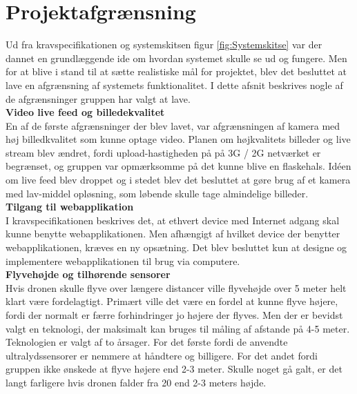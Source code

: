 \chapter{Projektafgrænsning}



Ud fra kravspecifikationen og systemskitsen figur \ref{fig:Systemskitse} var der dannet en grundlæggende ide om hvordan systemet skulle se ud og fungere. Men for at blive i stand til at sætte realistiske mål for projektet, blev det besluttet at lave en afgrænsning af systemets funktionalitet. I dette afsnit beskrives nogle af de afgrænsninger gruppen har valgt at lave. \\


\textbf{Video live feed og billedekvalitet}\\
En af de første afgrænsninger der blev lavet, var afgrænsningen af kamera med høj billedkvalitet som kunne optage video. Planen om højkvalitets billeder og live stream blev ændret, fordi upload-hastigheden på på 3G / 2G netværket er begrænset, og gruppen var opmærksomme på det kunne blive en flaskehals. Idéen om live feed blev droppet og i stedet blev det besluttet at gøre brug af et kamera med lav-middel opløsning, som løbende skulle tage almindelige billeder.\\

\textbf{Tilgang til webapplikation}\\
I kravspecifikationen beskrives det, at ethvert device med Internet adgang skal kunne benytte webapplikationen. Men afhængigt af hvilket device der benytter webapplikationen, kræves en ny opsætning. Det blev besluttet kun at designe og implementere webapplikationen til brug via computere.\\

\textbf{Flyvehøjde og tilhørende sensorer}\\
Hvis dronen skulle flyve over længere distancer ville flyvehøjde over 5 meter helt klart være fordelagtigt. Primært ville det være en fordel at kunne flyve højere, fordi der normalt er færre forhindringer jo højere der flyves. Men der er bevidst valgt en teknologi, der maksimalt kan bruges til måling af afstande på 4-5 meter. Teknologien er valgt af to årsager. For det første fordi de anvendte ultralydssensorer er nemmere at håndtere og billigere. For det andet fordi gruppen ikke ønskede at flyve højere end 2-3 meter. Skulle noget gå galt, er det langt farligere hvis dronen falder fra 20 end 2-3 meters højde.  
